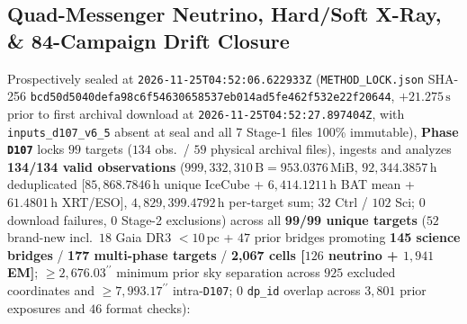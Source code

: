 \documentclass[twocolumn,10pt]{article}
\begin{document}
\subsection{Quad-Messenger Neutrino, Hard/Soft X-Ray, \& 84-Campaign Drift Closure}
Prospectively sealed at \texttt{2026-11-25T04:52:06.622933Z} (\texttt{METHOD\_LOCK.json} SHA-256 \texttt{bcd50d50\allowbreak 40defa98\allowbreak c6f54630\allowbreak 658537eb\allowbreak 014ad5fe\allowbreak 462f532e\allowbreak 22f20644}, $+21.275\,\text{s}$ prior to first archival download at \texttt{2026-11-25T04:52:27.897404Z}, with \texttt{inputs\_d107\_v6\_5} absent at seal and all 7 Stage-1 files 100\% immutable), \textbf{Phase \texttt{D107}} locks $99$ targets ($134$ obs.\ / $59$ physical archival files), ingests and analyzes \textbf{134/134 valid observations} ($999{,}332{,}310\,\text{B} = 953.0376\,\text{MiB}$, $92{,}344.3857\,\text{h}$ deduplicated [$85{,}868.7846\,\text{h}$ unique IceCube + $6{,}414.1211\,\text{h}$ BAT mean + $61.4801\,\text{h}$ XRT/ESO], $4{,}829{,}399.4792\,\text{h}$ per-target sum; $32$ Ctrl / $102$ Sci; $0$ download failures, $0$ Stage-2 exclusions) across all \textbf{99/99 unique targets} ($52$ brand-new incl.\ $18$ Gaia DR3 $<10\,\text{pc}$ + $47$ prior bridges promoting \textbf{145 science bridges} / \textbf{177 multi-phase targets} / \textbf{2,067 cells [$126$ neutrino + $1{,}941$ EM]}; $\ge 2{,}676.03^{\prime\prime}$ minimum prior sky separation across $925$ excluded coordinates and $\ge 7{,}993.17^{\prime\prime}$ intra-\texttt{D107}; $0$ \texttt{dp\_id} overlap across $3{,}801$ prior exposures and $46$ format checks):
\end{document}
